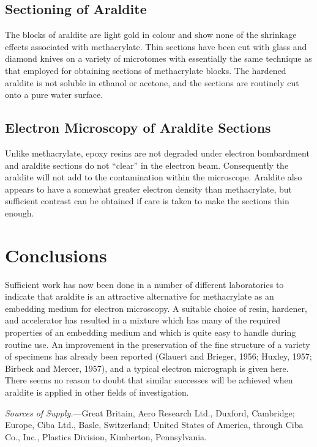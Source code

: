 \documentclass{article}
\begin{document}
\subsection*{Sectioning of Araldite}

The blocks of araldite are light gold in colour and show none of the shrinkage effects associated with methacrylate. Thin sections have been cut with glass and diamond knives on a variety of microtomes with essentially the same technique as that employed for obtaining sections of methacrylate blocks. The hardened araldite is not soluble in ethanol or acetone, and the sections are routinely cut onto a pure water surface.

\subsection*{Electron Microscopy of Araldite Sections}

Unlike methacrylate, epoxy resins are not degraded under electron bombardment and araldite sections do not ``clear'' in the electron beam. Consequently the araldite will not add to the contamination within the microscope. Araldite also appears to have a somewhat greater electron density than methacrylate, but sufficient contrast can be obtained if care is taken to make the sections thin enough.

\section*{Conclusions}

Sufficient work has now been done in a number of different laboratories to indicate that araldite is an attractive alternative for methacrylate as an embedding medium for electron microscopy. A suitable choice of resin, hardener, and accelerator has resulted in a mixture which has many of the required properties of an embedding medium and which is quite easy to handle during routine use. An improvement in the preservation of the fine structure of a variety of specimens has already been reported (Glauert and Brieger, 1956; Huxley, 1957; Birbeck and Mercer, 1957), and a typical electron micrograph is given here. There seems no reason to doubt that similar successes will be achieved when araldite is applied in other fields of investigation.

\textit{Sources of Supply.}—Great Britain, Aero Research Ltd., Duxford, Cambridge; Europe, Ciba Ltd., Basle, Switzerland; United States of America, through Ciba Co., Inc., Plastics Division, Kimberton, Pennsylvania.
\end{document}
